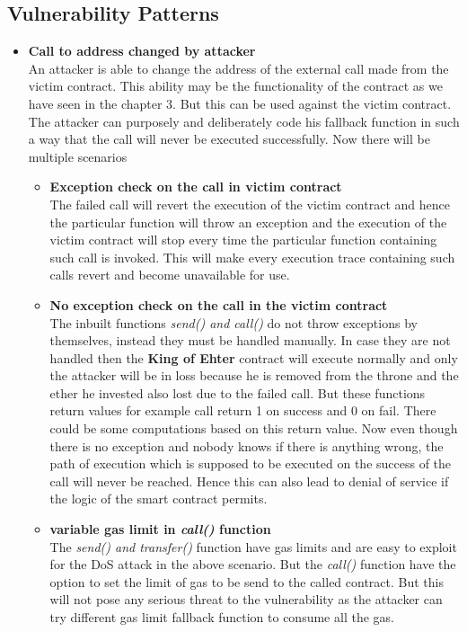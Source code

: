 \documentclass{article}
\begin{document}
\subsection*{Vulnerability Patterns}
\begin{itemize}
    \item \textbf{Call to address changed by attacker}\\
    An attacker is able to change the address of the external call made from the victim contract. This ability may be the functionality of the contract as we have seen in the chapter 3. But this can be used against the victim contract. The attacker can purposely and deliberately code his fallback function in such a way that the call will never be executed successfully. Now there will be multiple scenarios
    \begin{itemize}
        \item \textbf{Exception check on the call in victim contract}\\
        The failed call will revert the execution of the victim contract and hence the particular function will throw an exception and the execution of the victim contract will stop every time the particular function containing such call is invoked. This will make every execution trace containing such calls revert and become unavailable for use.
        \item \textbf{No exception check on the call in the victim contract}\\
        The inbuilt functions \emph{send() and call()} do not throw exceptions by themselves, instead they must be handled manually. In case they are not handled then the \textbf{King of Ehter} contract will execute normally and only the attacker will be in loss because he is removed from the throne and the ether he invested also lost due to the failed call. But these functions return values for example call return 1 on success and 0 on fail. There could be some computations based on this return value. Now even though there is no exception and nobody knows if there is anything wrong, the path of execution which is supposed to be executed on the success of the call will never be reached. Hence this can also lead to denial of service if the logic of the smart contract permits.
        \item \textbf{variable gas limit in \emph{call()} function}\\
        The \emph{send() and transfer()} function have gas limits and are easy to exploit for the DoS attack in the above scenario. But the \emph{call()} function have the option to set the limit of gas to be send to the called contract. But this will not pose any serious threat to the vulnerability as the attacker can try different gas limit fallback function to consume all the gas.

\end{itemize}
\end{itemize}
\end{document}
